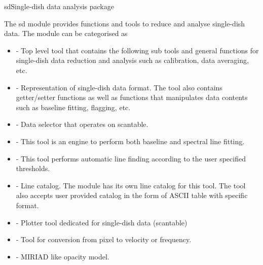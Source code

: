 \begin{ahmodule}{sd}{Single-dish data analysis package}

\begin{ahdescription}

The sd module provides functions and tools to reduce and analyse 
single-dish data. 
The module can be categorised as 

\begin{itemize}

\item {} - Top level tool that contains the following sub 
tools and general functions for single-dish data reduction 
and analysis such as calibration, data averaging, etc. 

\item {} - Representation of single-dish data 
format. The tool also contains getter/setter functions as well as functions 
that manipulates data contents such as baseline fitting, flagging, etc. 

\item {} - Data selector that operates on 
scantable.

\item {} - This tool is an engine to perform both 
baseline and spectral line fitting.

\item {} - This tool performs automatic 
line finding according to the user specified thresholds.

\item {} - Line catalog. The module has 
its own line catalog for this tool. The tool also accepts user provided 
catalog in the form of ASCII table with specific format.

\item {} - Plotter tool dedicated for 
single-dish data (scantable)


\item {} - Tool for conversion from pixel to 
velocity or frequency.


\item {} - MIRIAD like opacity model.

\end{itemize}


\end{ahdescription}

\ahobjs{}
\ahfuncs{}



\end{ahmodule}

